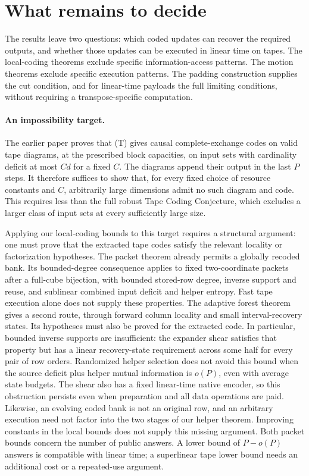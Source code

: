 \section{What remains to decide}\label{sec:roadmap}

The results leave two questions: which coded updates can recover the required
outputs, and whether those updates can be executed in linear time on tapes.
The local-coding theorems exclude specific information-access patterns. The
motion theorems exclude specific execution patterns. The padding construction
supplies the cut condition, and for linear-time payloads the full limiting
conditions, without requiring a transpose-specific computation.

\paragraph{An impossibility target.}
The earlier paper proves that \textup{(T)} gives causal complete-exchange codes
on valid tape diagrams, at the prescribed block capacities, on input sets with
cardinality deficit at most $Cd$ for a fixed $C$. The diagrams append their
output in the last $P$ steps. It therefore suffices to show that, for every
fixed choice of resource constants and $C$, arbitrarily large dimensions admit
no such diagram and code. This requires less than the full robust Tape Coding Conjecture, which
excludes a larger class of input sets at every sufficiently large size.

Applying our local-coding bounds to this target requires a structural
argument: one must prove that the extracted tape codes satisfy the relevant
locality or factorization hypotheses. The packet theorem already permits a
globally recoded bank. Its bounded-degree consequence applies to fixed
two-coordinate packets after a full-cube bijection, with bounded stored-row
degree, inverse support and reuse, and sublinear combined input deficit and
helper entropy. Fast tape execution alone does not supply these properties.
The adaptive forest theorem gives a second route, through forward column
locality and small interval-recovery states. Its hypotheses must also be
proved for the extracted code. In particular, bounded inverse supports are
insufficient: the expander shear satisfies that property but has a linear
recovery-state requirement across some half for every pair of row orders.
Randomized helper selection does not avoid this bound when the source deficit
plus helper mutual information is $o(P)$, even with average state budgets.
The shear also has a fixed linear-time native encoder, so this obstruction
persists even when preparation and all data operations are paid.
Likewise, an evolving coded bank is not an original row, and an
arbitrary execution need not factor into the two stages of our helper theorem.
Improving constants in the local bounds does not supply this missing argument.
Both packet bounds concern the number of public answers. A lower bound of
$P-o(P)$ answers is compatible with linear time; a superlinear tape lower
bound needs an additional cost or a repeated-use argument.

